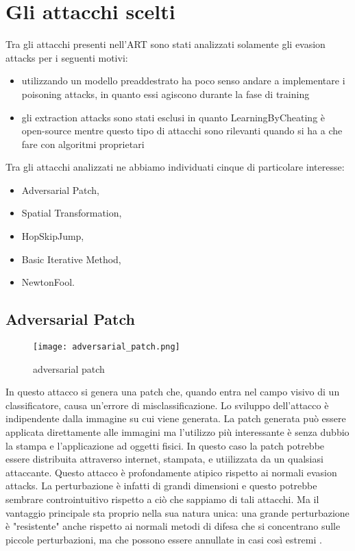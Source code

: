 \section{Gli attacchi scelti}
Tra gli attacchi presenti nell'ART sono stati analizzati solamente gli evasion attacks per i seguenti motivi:\begin{itemize}
    \item utilizzando un modello preaddestrato ha poco senso andare a implementare i poisoning attacks, in quanto essi agiscono durante la fase di training
    \item gli extraction attacks sono stati esclusi in quanto LearningByCheating è open-source mentre questo tipo di attacchi sono rilevanti quando si ha a che fare
    con algoritmi proprietari
\end{itemize}
Tra gli attacchi analizzati ne abbiamo individuati cinque di particolare interesse:\begin{itemize}
    \item Adversarial Patch,
    \item Spatial Transformation,
    \item HopSkipJump,
    \item Basic Iterative Method,
    \item NewtonFool.
\end{itemize}
\subsection{Adversarial Patch} 
\begin{figure}[h]
    \texttt{[image: adversarial\_patch.png]}
    \caption{adversarial patch\cite{patch}}
    \label{fig:patch}
\end{figure}
In questo attacco si genera una patch che, quando entra nel campo visivo di un classificatore, causa un'errore di misclassificazione. Lo sviluppo dell'attacco è 
indipendente dalla immagine su cui viene generata. La patch generata può essere applicata direttamente alle immagini ma l'utilizzo più interessante è senza dubbio la stampa e l'applicazione
ad oggetti fisici. In questo caso la patch potrebbe essere distribuita attraverso internet, stampata, e utiilizzata da un qualsiasi attaccante. Questo attacco è profondamente atipico rispetto
ai normali evasion attacks. La perturbazione è infatti di grandi dimensioni e questo potrebbe sembrare controintuitivo rispetto a ciò che sappiamo di tali attacchi. Ma il vantaggio principale
sta proprio nella sua natura unica: una grande perturbazione è "resistente" anche rispetto ai normali metodi di difesa che si concentrano sulle piccole perturbazioni, ma che possono essere annullate in 
casi così estremi \cite{patch}. 

